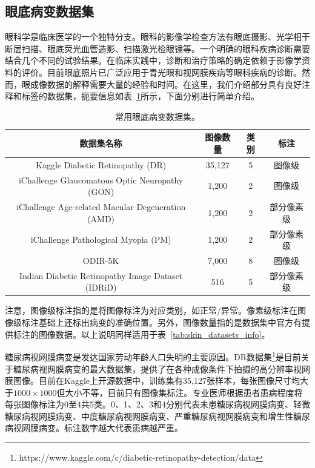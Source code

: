 \subsection{眼底病变数据集}
眼科学是临床医学的一个独特分支。眼科的影像学检查方法有眼底摄影、光学相干断层扫描、眼底荧光血管造影、扫描激光检眼镜等。一个明确的眼科疾病诊断需要结合几个不同的试验结果。在临床实践中，诊断和治疗策略的确定依赖于影像学资料的评价。目前眼底照片已广泛应用于青光眼和视网膜疾病等眼科疾病的诊断。然而，眼成像数据的解释需要大量的经验和时间。在这里，我们介绍部分具有良好注释和标签的数据集，扼要信息如表~\ref{tab:datasets_info}所示，下面分别进行简单介绍。
\begin{table}[h]
	\centering
	\caption{常用眼底病变数据集。}		
	\label{tab:datasets_info}
	\begin{tabular}{c|c|c|c}
		\toprule[2pt]
		数据集名称 & 图像数量 & 类别 & 标注 \\
		\midrule[2pt]
		Kaggle Diabetic Retinopathy (DR)	& 35,127	& 5	&图像级 \\
		\hline                         
		iChallenge Glaucomatous Optic Neuropathy (GON)    & 1,200    & 2 & 图像级 \\ \hline
		iChallenge Age-related Macular Degeneration (AMD) & 1,200    & 2 & 部分像素级 \\ \hline
		iChallenge Pathological Myopia (PM)               & 1,200    & 2 & 部分像素级 \\ \hline
		ODIR-5K & 7,000 & 8 & 图像级 \\ \hline
		
		Indian Diabetic Retinopathy Image Dataset (IDRiD) & 516 & 5 & 部分像素级 \\
		\bottomrule[2pt]
	\end{tabular}
\end{table}

注意，图像级标注指的是将图像标注为对应类别，如正常/异常。像素级标注在图像级标注基础上还标出病变的准确位置。另外，图像数量指的是数据集中官方有提供标注的图像数据。以上说明同样适用于表~\ref{tab:skin_datasets_info}。

糖尿病视网膜病变是发达国家劳动年龄人口失明的主要原因。DR数据集\footnote{https://www.kaggle.com/c/diabetic-retinopathy-detection/data}是目前关于糖尿病视网膜病变的最大数据集，提供了在各种成像条件下拍摄的高分辨率视网膜图像。目前在Kaggle上开源数据中，训练集有35,127张样本，每张图像尺寸均大于$1000\times 1000$但大小不等，目前只有图像集标注。专业医师根据患者患病程度将每张图像标注为0至4共5类。0、1、2、3和4分别代表未患糖尿病视网膜病变、轻微糖尿病视网膜病变、中度糖尿病视网膜病变、严重糖尿病视网膜病变和增生性糖尿病视网膜病变。标注数字越大代表患病越严重。

